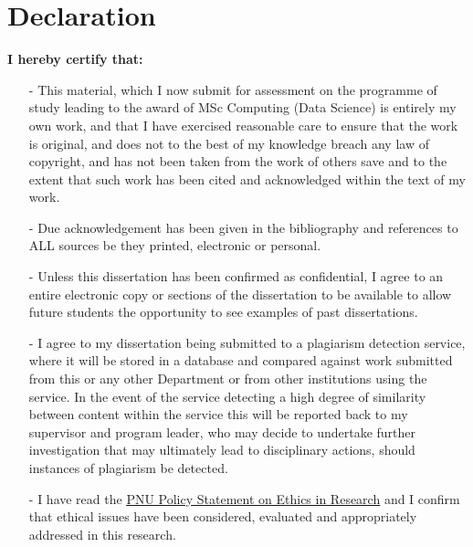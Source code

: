 \documentclass[12pt]{article}
\begin{document}
\begin{spacing}{-10}
    \normalsize
    \tableofcontents{}
\end{spacing}

\newpage

\section*{Declaration}
\textbf{I hereby certify that:}
\begin{enumerate}
\item[-] This material, which I now submit for assessment on the programme of study leading to the award of MSc Computing (Data Science) is entirely my own work, and that I have exercised reasonable care to ensure that the work is original, and does not to the best of my knowledge breach any law of copyright, and has not been taken from the work of others save and to the extent that such work has been cited and acknowledged within the text of my work.
\item[-] Due acknowledgement has been given in the bibliography and references to ALL sources be they printed, electronic or personal.
\item[-] Unless this dissertation has been confirmed as confidential, I agree to an entire electronic copy or sections of the dissertation to be available to allow future students the opportunity to see examples of past dissertations.
\item[-] I agree to my dissertation being submitted to a plagiarism detection service, where it will be stored in a database and compared against work submitted from this or any other Department or from other institutions using the service. In the event of the service detecting a high degree of similarity between content within the service this will be reported back to my supervisor and program leader, who may decide to undertake further investigation that may ultimately lead to disciplinary actions, should instances of plagiarism be detected.
\item[-] I have read the \href{https://www.pnu.edu.sa/ar/Deanship/PostGraduate/Documents/دليل%20الأخلاقيات%20البحثية%20والأمانة%20العلمية%20والملكية%20الفكرية.pdf}{\underline{PNU Policy Statement on Ethics in Research}} and I confirm that ethical issues have been considered, evaluated and appropriately addressed in this research.
\end{enumerate}
\end{document}
